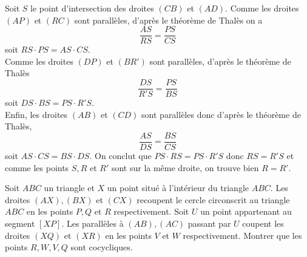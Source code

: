 \begin{sol}
\begin{center}
\end{center}

Soit $S$ le point d'intersection des droites $(CB)$ et $(AD)$. Comme les droites $(AP)$ et $(RC)$ sont parallèles, d'après le théorème de Thalès on a
$$\frac{AS}{RS}=\frac{PS}{CS}$$ soit $RS\cdot PS=AS\cdot CS$.
\\
Comme les droites $(DP)$ et $(BR')$ sont parallèles, d'après le théorème de Thalès
$$\frac{DS}{R'S}=\frac{PS}{BS}$$ soit $DS\cdot BS= PS\cdot R'S$.
\\
Enfin, les droites $(AB)$ et $(CD)$ sont parallèles donc d'après le théorème de Thalès,
$$\frac{AS}{DS}=\frac{BS}{CS}$$ soit $AS\cdot CS=BS\cdot DS$. On conclut que $PS\cdot RS=PS\cdot R'S$ donc $RS=R'S$ et comme les points $S,R$ et $R'$ sont sur la même droite, on trouve bien $R=R'$.
\end{sol}

\begin{exo}
Soit $ABC$ un triangle et $X$ un point situé à l'intérieur du triangle $ABC$. Les droites $(AX), (BX)$ et $(CX)$ recoupent le cercle circonscrit au triangle $ABC$ en les points $P,Q$ et $R$ respectivement. Soit $U$ un point appartenant au segment $[XP]$. Les parallèles à $(AB),(AC)$ passant par $U$ coupent les droites $(XQ)$ et $(XR)$ en les points $V$ et $W$ respectivement. Montrer que les points $R,W,V,Q$ sont cocycliques.
\end{exo}

